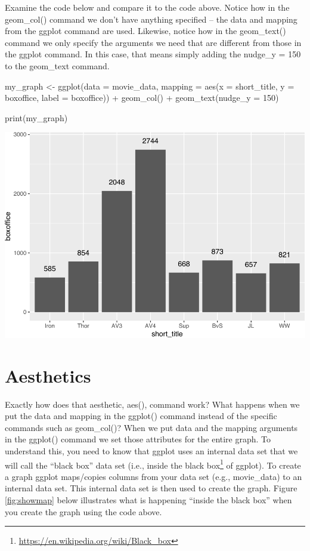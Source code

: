 \documentclass[
]{krantz}
\makeatletter
\newenvironment{Shaded}{\begin{snugshade}}{\end{snugshade}}
\newcommand{\AttributeTok}[1]{\textcolor[rgb]{0.61,0.61,0.61}{#1}}
\newcommand{\DecValTok}[1]{\textcolor[rgb]{0.06,0.06,0.06}{#1}}
\newcommand{\FunctionTok}[1]{\textcolor[rgb]{0,0,0}{#1}}
\newcommand{\NormalTok}[1]{#1}
\newcommand{\OtherTok}[1]{\textcolor[rgb]{0.37,0.37,0.37}{#1}}
\newcommand{\SpecialCharTok}[1]{\textcolor[rgb]{0,0,0}{#1}}
\renewcommand{\href}[2]{#2\footnote{\url{#1}}}
\newenvironment{kframe}{%
\medskip{}
\setlength{\fboxsep}{.8em}
 \def\at@end@of@kframe{}%
 \ifinner\ifhmode%
  \def\at@end@of@kframe{\end{minipage}}%
  \begin{minipage}{\columnwidth}%
 \fi\fi%
 \def\FrameCommand##1{\hskip\@totalleftmargin \hskip-\fboxsep
 \colorbox{shadecolor}{##1}\hskip-\fboxsep
     \hskip-\linewidth \hskip-\@totalleftmargin \hskip\columnwidth}%
 \MakeFramed {\advance\hsize-\width
   \@totalleftmargin\z@ \linewidth\hsize
   \@setminipage}}%
 {\par\unskip\endMakeFramed%
 \at@end@of@kframe}
\renewenvironment{Shaded}{\begin{kframe}}{\end{kframe}}
\makeatother
\begin{document}
Examine the code below and compare it to the code above. Notice how in the geom\_col() command we don't have anything specified -- the data and mapping from the ggplot command are used. Likewise, notice how in the geom\_text() command we only specify the arguments we need that are different from those in the ggplot command. In this case, that means simply adding the nudge\_y = 150 to the geom\_text command.

\begin{Shaded}
\begin{Highlighting}[]
\NormalTok{my\_graph }\OtherTok{\textless{}{-}} \FunctionTok{ggplot}\NormalTok{(}\AttributeTok{data =}\NormalTok{ movie\_data,}
           \AttributeTok{mapping =} \FunctionTok{aes}\NormalTok{(}\AttributeTok{x =}\NormalTok{ short\_title,}
                         \AttributeTok{y =}\NormalTok{ boxoffice,}
                         \AttributeTok{label =}\NormalTok{ boxoffice)) }\SpecialCharTok{+}
  \FunctionTok{geom\_col}\NormalTok{() }\SpecialCharTok{+}
  \FunctionTok{geom\_text}\NormalTok{(}\AttributeTok{nudge\_y =} \DecValTok{150}\NormalTok{) }

\FunctionTok{print}\NormalTok{(my\_graph)}
\end{Highlighting}
\end{Shaded}

\includegraphics[width=0.65\linewidth]{bookdown_files/figure-latex/unnamed-chunk-104-1}

\hypertarget{aesthetics}{%
\section{Aesthetics}\label{aesthetics}}

Exactly how does that aesthetic, aes(), command work? What happens when we put the data and mapping in the ggplot() command instead of the specific commands such as geom\_col()? When we put data and the mapping arguments in the ggplot() command we set those attributes for the entire graph. To understand this, you need to know that ggplot uses an internal data set that we will call the ``black box'' data set (i.e., inside the \href{https://en.wikipedia.org/wiki/Black_box}{black box} of ggplot). To create a graph ggplot maps/copies columns from your data set (e.g., movie\_data) to an internal data set. This internal data set is then used to create the graph. Figure \ref{fig:showmap} below illustrates what is happening ``inside the black box'' when you create the graph using the code above.
\end{document}
